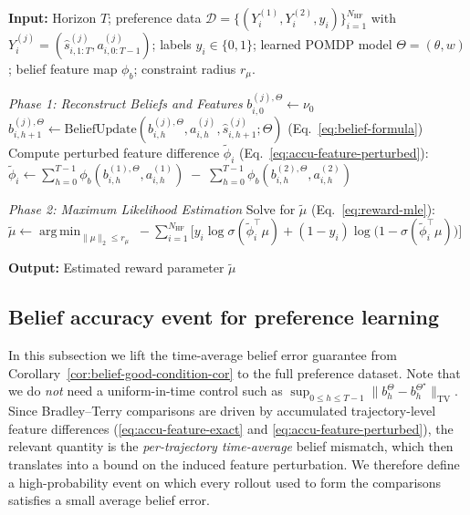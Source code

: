 \documentclass[10pt]{article} %
\DeclareMathOperator*{\argmin}{arg\,min}
\theoremstyle{plain}
\theoremstyle{definition}
\theoremstyle{remark}
\begin{document}
\begin{algorithm}[t]
\caption{Preference-Based Reward Learning via Learned Beliefs}
\label{alg:reward-learning}
\begin{algorithmic}[1]
\STATE \textbf{Input:}
Horizon $T$;
preference data $\mathcal{D} = \{(Y_i^{(1)},Y_i^{(2)},y_i)\}_{i=1}^{N_{\mathrm{HF}}}$ with
$Y_i^{(j)}=(\hat s^{(j)}_{i,1:T},a^{(j)}_{i,0:T-1})$;
labels $y_i\in\{0,1\}$;
learned POMDP model $\Theta=(\theta,w)$; belief feature map $\phi_b$; constraint radius $r_\mu$.

\STATE \textit{Phase 1: Reconstruct Beliefs and Features}
        \STATE $b^{(j),\Theta}_{i,0}\gets \nu_0$
            \STATE $b^{(j),\Theta}_{i,h+1}\gets \text{BeliefUpdate}\!\left(
            b^{(j),\Theta}_{i,h},a^{(j)}_{i,h},\hat s^{(j)}_{i,h+1};\Theta\right)$
            \hfill{\small (Eq.~\ref{eq:belief-formula})}
        \ENDFOR
    \ENDFOR
    \STATE Compute perturbed feature difference $\tilde\phi_i$ (Eq.~\ref{eq:accu-feature-perturbed}):
    \STATE $\tilde\phi_i \gets \sum_{h=0}^{T-1}\phi_b\!\left(b^{(1),\Theta}_{i,h},a^{(1)}_{i,h}\right)
                 \;-\; \sum_{h=0}^{T-1}\phi_b\!\left(b^{(2),\Theta}_{i,h},a^{(2)}_{i,h}\right)$
\ENDFOR

\STATE \textit{Phase 2: Maximum Likelihood Estimation}
\STATE Solve for $\tilde\mu$ (Eq.~\ref{eq:reward-mle}):
\STATE $\tilde\mu \gets \argmin_{\|\mu\|_2\le r_\mu}\;
-\sum_{i=1}^{N_{\mathrm{HF}}}\Big[y_i\log\sigma(\tilde\phi_i^\top\mu)
+(1-y_i)\log\big(1-\sigma(\tilde\phi_i^\top\mu)\big)\Big]$

\STATE \textbf{Output:} Estimated reward parameter $\tilde\mu$
\end{algorithmic}
\end{algorithm}





\subsection{Belief accuracy event for preference learning}
\label{subsec:belief-event}
In this subsection we lift the time-average belief error guarantee from
Corollary~\ref{cor:belief-good-condition-cor} to the full preference dataset.
Note that we do \emph{not} need a uniform-in-time control such as
$\sup_{0\le h\le T-1}\|b_h^\Theta-b_h^{\Theta^\star}\|_{\mathrm{TV}}$.
Since Bradley--Terry comparisons are driven by accumulated trajectory-level  feature differences (\ref{eq:accu-feature-exact} and \ref{eq:accu-feature-perturbed}), the relevant quantity is the \emph{per-trajectory time-average} belief
mismatch, which then translates into a bound on the induced feature perturbation.
We therefore define a high-probability event on which every rollout used to form the
comparisons satisfies a small average belief error.
\end{document}

